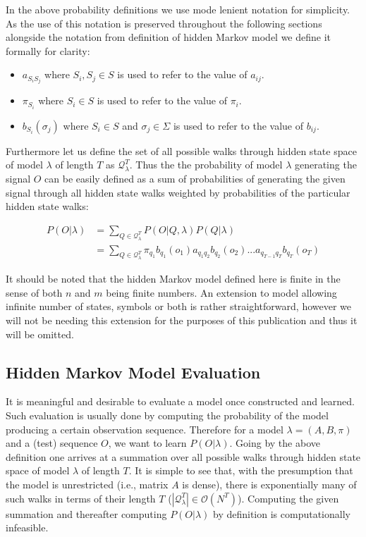 In the above probability definitions we use mode lenient notation for simplicity. As the use of this notation is preserved throughout the following sections alongside the notation from definition of hidden Markov model we define it formally for clarity:
\begin{itemize}
	\item[] $a_{S_iS_j}$ where $S_i, S_j\in S$ is used to refer to the value of $a_{ij}$.
	\item[] $\pi_{S_i}$ where $S_i\in S$ is used to refer to the value of $\pi_i$.
	\item[] $b_{S_i}(\sigma_j)$ where $S_i\in S$ and $\sigma_j\in \Sigma$ is used to refer to the value of $b_{ij}$.
\end{itemize}

Furthermore let us define the set of all possible walks through hidden state space of model $\lambda$ of length $T$ as $\mathcal{Q}_\lambda^T$. Thus the the probability of model $\lambda$ generating the signal $O$ can be easily defined as a sum of probabilities of generating the given signal through all hidden state walks weighted by probabilities of the particular hidden state walks: 

\begin{align*}
P(O|\lambda)&=\sum_{Q\in\mathcal{Q}^T_\lambda}{P(O|Q,\lambda)P(Q|\lambda)}\\
&=\sum_{Q\in\mathcal{Q}^T_\lambda}{\pi_{q_1}b_{q_1}(o_1)a_{q_1q_2}b_{q_2}(o_2)...a_{q_{T-1}q_T}b_{q_T}(o_T)}
\end{align*}

It should be noted that the hidden Markov model defined here is finite in the sense of both $n$ and $m$ being finite numbers. An extension to model allowing infinite number of states, symbols or both is rather straightforward, however we will not be needing this extension for the purposes of this publication and thus it will be omitted.

\subsection{Hidden Markov Model Evaluation}
It is meaningful and desirable to evaluate a model once constructed and learned. Such evaluation is usually done by computing the probability of the model producing a certain observation sequence. Therefore for a model $\lambda = (A, B, \pi)$ and a (test) sequence $O$, we want to learn $P(O|\lambda)$. Going by the above definition one arrives at a summation over all possible walks through hidden state space of model $\lambda$ of length $T$. It is simple to see that, with the presumption that the model is unrestricted (i.e., matrix $A$ is dense), there is exponentially many of such walks in terms of their length $T$ ($|\mathcal{Q}_\lambda^T|\in\mathcal{O}(N^T)$). Computing the given summation and thereafter computing $P(O|\lambda)$ by definition is computationally infeasible.

